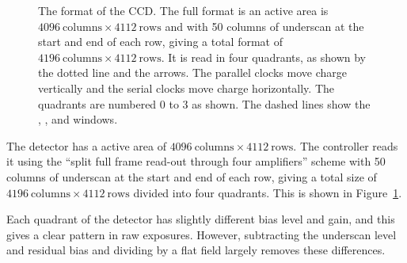 \begin{figure}[p]
\begin{center}
\caption{The format of the CCD. The full format is an active area is $4096~\mbox{columns} \times 4112~\mbox{rows}$ and with 50 columns of underscan at the start and end of each row, giving a total format of $4196~\mbox{columns} \times 4112~\mbox{rows}$. It is read in four quadrants, as shown by the dotted line and the arrows. The parallel clocks move charge vertically and the serial clocks move charge horizontally. The quadrants are numbered 0 to 3 as shown. The dashed lines show the , , and  windows.}
\label{figure:format}
\end{center}
\end{figure}

The detector has a active area of  $4096~\mbox{columns} \times 4112~\mbox{rows}$. The controller reads it using the “split full frame read-out through four amplifiers” scheme \citep[p.~17]{e2v} with 50 columns of underscan at the start and end of each row, giving a total size of $4196~\mbox{columns} \times 4112~\mbox{rows}$ divided into four quadrants. This is shown in Figure~\ref{figure:format}.

Each quadrant of the detector has slightly different bias level and gain, and this gives a clear pattern in raw exposures. However, subtracting the underscan level and residual bias and dividing by a flat field largely removes these differences.

